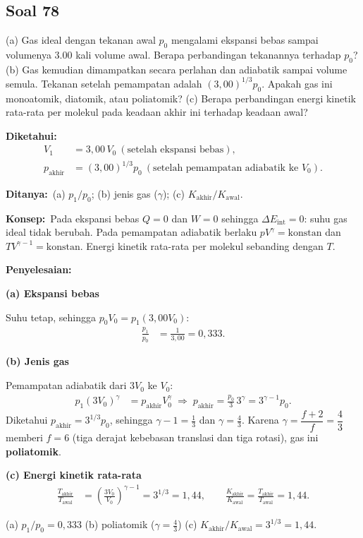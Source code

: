 \documentclass[12pt,a4paper]{article}
\newcommand{\diketahui}{\par\medskip\noindent\textbf{Diketahui:}}
\newcommand{\ditanya}{\par\medskip\noindent\textbf{Ditanya:}}
\newcommand{\konsep}{\par\medskip\noindent\textbf{Konsep:}}
\newcommand{\penyelesaian}{\par\medskip\noindent\textbf{Penyelesaian:}\par\nopagebreak}
\newcommand{\soal}[1]{%
  \setcounter{equation}{0}%
  \phantomsection
  \addcontentsline{toc}{subsection}{Soal #1}%
  \subsection*{Soal #1}}
\begin{document}
\soal{78}
(a) Gas ideal dengan tekanan awal $p_0$ mengalami ekspansi bebas sampai volumenya \num{3,00} kali volume awal. Berapa perbandingan tekanannya terhadap $p_0$? (b) Gas kemudian dimampatkan secara perlahan dan adiabatik sampai volume semula. Tekanan setelah pemampatan adalah $(3{,}00)^{1/3}p_0$. Apakah gas ini monoatomik, diatomik, atau poliatomik? (c) Berapa perbandingan energi kinetik rata-rata per molekul pada keadaan akhir ini terhadap keadaan awal?

\diketahui
\begin{align*}
V_1 &= 3{,}00\,V_0\ (\text{setelah ekspansi bebas}),\\
p_{\text{akhir}} &= (3{,}00)^{1/3}p_0\ (\text{setelah pemampatan adiabatik ke } V_0).
\end{align*}
\ditanya\ (a) $p_1/p_0$; (b) jenis gas ($\gamma$); (c) $K_{\text{akhir}}/K_{\text{awal}}$.

\konsep\ Pada ekspansi bebas $Q=0$ dan $W=0$ sehingga $\Delta E_{\text{int}}=0$: suhu gas ideal tidak berubah. Pada pemampatan adiabatik berlaku $pV^{\gamma}=\text{konstan}$ dan $TV^{\gamma-1}=\text{konstan}$. Energi kinetik rata-rata per molekul sebanding dengan $T$.

\penyelesaian

\noindent\textbf{(a) Ekspansi bebas}

Suhu tetap, sehingga $p_0V_0=p_1(3{,}00V_0)$:
\begin{align*}
\frac{p_1}{p_0} &= \frac{1}{3{,}00} = 0{,}333.
\end{align*}

\noindent\textbf{(b) Jenis gas}

Pemampatan adiabatik dari $3V_0$ ke $V_0$:
\begin{align*}
p_1(3V_0)^{\gamma} &= p_{\text{akhir}}V_0^{\gamma}
\;\Rightarrow\;
p_{\text{akhir}} = \frac{p_0}{3}\,3^{\gamma} = 3^{\gamma-1}p_0.
\end{align*}
Diketahui $p_{\text{akhir}}=3^{1/3}p_0$, sehingga $\gamma-1=\tfrac13$ dan $\gamma=\tfrac43$. Karena $\gamma=\dfrac{f+2}{f}=\dfrac43$ memberi $f=6$ (tiga derajat kebebasan translasi dan tiga rotasi), gas ini \textbf{poliatomik}.

\noindent\textbf{(c) Energi kinetik rata-rata}
\begin{align*}
\frac{T_{\text{akhir}}}{T_{\text{awal}}} &= \left(\frac{3V_0}{V_0}\right)^{\gamma-1} = 3^{1/3} = 1{,}44,
\qquad
\frac{K_{\text{akhir}}}{K_{\text{awal}}} = \frac{T_{\text{akhir}}}{T_{\text{awal}}} = 1{,}44.
\end{align*}
\begin{jawaban}
(a) $p_1/p_0=0{,}333$ \quad (b) poliatomik ($\gamma=\tfrac43$) \quad (c) $K_{\text{akhir}}/K_{\text{awal}}=3^{1/3}=1{,}44$.
\end{jawaban}
\end{document}
